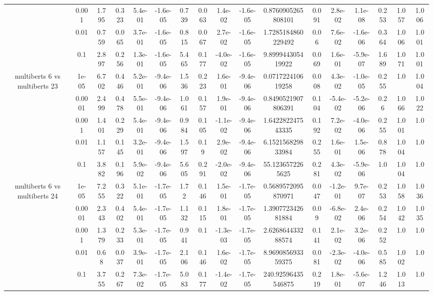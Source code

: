 \begin{tabular}{|c|c|c|c|c|c|c|c|c|c|c|c|c|c|c|c|c|}
 & 0.001 & 1.795 & 0.323 & 5.4e-01 & -1.6e-05 & 0.739 & 0.063 & 1.4e-02 & -1.6e-05 & 0.8760905265808101 & 0.091 & 2.8e-02 & 1.1e-08 & 0.253 & 1.057 & 1.006 \\
 & 0.01 & 0.759 & 0.065 & 3.7e-01 & -1.6e-05 & 0.815 & 0.067 & 2.7e-02 & -1.6e-05 & 1.7285184860229492 & 0.06 & 7.6e-02 & -1.6e-06 & 0.364 & 1.006 & 1.001 \\
 & 0.1 & 2.897 & 0.256 & 1.3e-01 & -1.6e-05 & 5.465 & 0.177 & -4.0e-02 & -1.6e-05 & 9.899944305419922 & 0.069 & 1.6e-01 & -5.9e-07 & 1.689 & 1.071 & 1.001 \\
\hline
\multirow{5}{*}{multiberts 6 vs multiberts 23} & 1e-05 & 6.702 & 0.446 & 5.2e-01 & -9.4e-06 & 1.536 & 0.223 & 1.6e-01 & -9.4e-06 & 0.071722410619258 & 0.008 & 4.3e-02 & -1.0e-05 & 0.255 & 1.0 & 1.004 \\
 & 0.0001 & 2.499 & 0.478 & 5.5e-01 & -9.4e-06 & 1.061 & 0.157 & 1.9e-01 & -9.4e-06 & 0.8490521907806391 & 0.104 & -5.4e-02 & -5.2e-06 & 0.26 & 1.066 & 1.022 \\
 & 0.001 & 1.401 & 0.229 & 5.4e-01 & -9.4e-06 & 0.984 & 0.105 & -1.1e-02 & -9.4e-06 & 1.642282247543335 & 0.192 & 7.2e-02 & -4.0e-06 & 0.255 & 1.001 & 1.0 \\
 & 0.01 & 1.157 & 0.145 & 3.2e-01 & -9.4e-06 & 1.597 & 0.19 & 2.9e-02 & -9.4e-06 & 6.152156829833984 & 0.255 & 1.6e-01 & 1.5e-06 & 0.878 & 1.004 & 1.0 \\
 & 0.1 & 3.882 & 0.196 & 5.9e-02 & -9.4e-06 & 5.605 & 0.291 & -2.0e-02 & -9.4e-06 & 55.1236572265625 & 0.281 & 4.3e-02 & -5.9e-06 & 1.0 & 1.004 & 1.0 \\
\hline
\multirow{5}{*}{multiberts 6 vs multiberts 24} & 1e-05 & 7.255 & 0.322 & 5.1e-01 & -1.7e-05 & 1.72 & 0.146 & 1.5e-01 & -1.7e-05 & 0.5689572095870971 & 0.047 & -1.2e-01 & 9.7e-07 & 0.253 & 1.058 & 1.036 \\
 & 0.0001 & 2.343 & 0.402 & 5.4e-01 & -1.7e-05 & 1.132 & 0.115 & 1.8e-01 & -1.7e-05 & 1.390772342681884 & 0.09 & -6.8e-02 & 2.4e-06 & 0.254 & 1.042 & 1.035 \\
 & 0.001 & 1.379 & 0.233 & 5.3e-01 & -1.7e-05 & 0.941 & 0.1 & -1.3e-03 & -1.7e-05 & 2.626864433288574 & 0.141 & 2.1e-02 & 3.2e-06 & 0.252 & 1.0 & 1.0 \\
 & 0.01 & 0.68 & 0.037 & 3.9e-01 & -1.7e-05 & 2.106 & 0.146 & 1.6e-02 & -1.7e-05 & 8.969085693359375 & 0.081 & -2.3e-02 & -4.0e-06 & 0.585 & 1.002 & 1.0 \\
 & 0.1 & 3.755 & 0.267 & 7.3e-02 & -1.7e-05 & 5.083 & 0.177 & -1.4e-02 & -1.7e-05 & 240.92596435546875 & 0.219 & 1.8e-01 & -5.6e-07 & 1.246 & 1.013 & 1.0 \\

\end{tabular}
